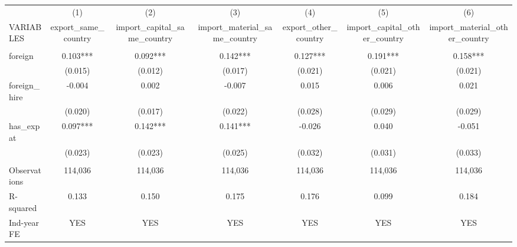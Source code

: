 \begin{tabular}{lcccccc} \hline
 & (1) & (2) & (3) & (4) & (5) & (6) \\
VARIABLES & export\_same\_country & import\_capital\_same\_country & import\_material\_same\_country & export\_other\_country & import\_capital\_other\_country & import\_material\_other\_country \\ \hline
 &  &  &  &  &  &  \\
foreign & 0.103*** & 0.092*** & 0.142*** & 0.127*** & 0.191*** & 0.158*** \\
 & (0.015) & (0.012) & (0.017) & (0.021) & (0.021) & (0.021) \\
foreign\_hire & -0.004 & 0.002 & -0.007 & 0.015 & 0.006 & 0.021 \\
 & (0.020) & (0.017) & (0.022) & (0.028) & (0.029) & (0.029) \\
has\_expat & 0.097*** & 0.142*** & 0.141*** & -0.026 & 0.040 & -0.051 \\
 & (0.023) & (0.023) & (0.025) & (0.032) & (0.031) & (0.033) \\
 &  &  &  &  &  &  \\
Observations & 114,036 & 114,036 & 114,036 & 114,036 & 114,036 & 114,036 \\
R-squared & 0.133 & 0.150 & 0.175 & 0.176 & 0.099 & 0.184 \\
 Ind-year FE & YES & YES & YES & YES & YES & YES \\ \hline
\end{tabular}

